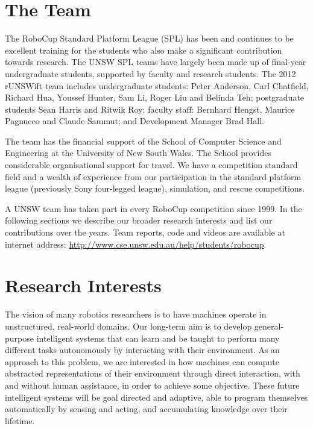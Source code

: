 \documentclass[runningheads,a4paper]{llncs}
\begin{document}
\section{The Team}
The RoboCup Standard Platform League (SPL) has been and continues to be excellent training for the students who also make a significant contribution towards research. The UNSW SPL teams have largely been made up of final-year undergraduate students, supported by faculty and research students. The 2012 rUNSWift team includes undergraduate students: Peter Anderson, Carl Chatfield, Richard Hua, Youssef Hunter, Sam Li, Roger Liu and Belinda Teh; postgraduate students Sean Harris and Ritwik Roy; faculty staff: Bernhard Hengst, Maurice Pagnucco and Claude Sammut; and Development Manager Brad Hall. %

The team has the financial support of the School of Computer Science and Engineering at the University of New South Wales.  The School provides considerable organisational support for travel. We have a competition standard field and a wealth of experience from our participation in the standard platform league (previously Sony four-legged league), simulation, and rescue competitions. 

A UNSW team has taken part in every RoboCup competition since 1999. In the following sections we describe our broader research interests and list our contributions over the years. Team reports, code and videos are available at internet address: \url{http://www.cse.unsw.edu.au/help/students/robocup}.

\section{Research Interests}

The vision of many robotics researchers is to have machines operate in unstructured, real-world domains. Our long-term aim is to develop general-purpose intelligent systems that can learn and be taught to perform many different tasks autonomously by interacting with their environment. As an approach to this problem, we are interested in how machines can compute abstracted representations of their environment through direct interaction, with and without human assistance, in order to achieve some objective. These future intelligent systems will be goal directed and adaptive, able to program themselves automatically by sensing and acting, and accumulating knowledge over their lifetime.  
\end{document}
